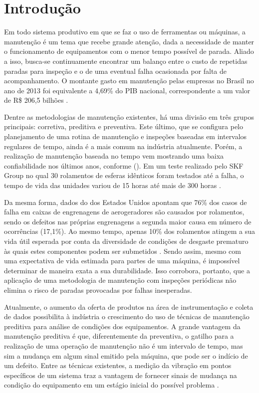 \documentclass[12pt,openright,oneside,a4paper,
	chapter=TITLE,section=TITLE,
	english,brazil]{abntex2}
\begin{document}
	
	\textual %
	
	\chapter{Introdução}
	Em todo sistema produtivo em que se faz o uso de ferramentas ou máquinas, a manutenção é um tema que recebe grande atenção, dada a necessidade de manter o funcionamento de equipamentos com o menor tempo possível de parada. Aliado a isso, busca-se continuamente encontrar um balanço entre o custo de repetidas paradas para inspeção e o de uma eventual falha ocasionada por falta de acompanhamento. O montante gasto em manutenção pelas empresas no Brasil no ano de 2013 foi equivalente a 4,69\% do PIB nacional, correspondente a um valor de R\$ 206,5 bilhões \cite{seleme:2015}.
	
	Dentre as metodologias de manutenção existentes, há uma divisão em três grupos principais: corretiva, preditiva e preventiva. Este último, que se configura pelo planejamento de uma rotina de manutenção e inspeções baseadas em intervalos regulares de tempo, ainda é a mais comum na indústria atualmente. Porém, a realização de manutenção baseada no tempo vem mostrando uma baixa confiabilidade nos últimos anos, conforme  (\citeyear{hashemian:2011}). Em um teste realizado pelo SKF Group no qual 30 rolamentos de esferas idênticos foram testados até a falha, o tempo de vida das unidades variou de 15 horas até mais de 300 horas \cite{hashemian:2011}.  
	
	Da mesma forma, dados do  dos Estados Unidos apontam que 76\% dos casos de falha em caixas de engrenagens de aerogeradores são causados por rolamentos, sendo os defeitos nas próprias engrenagens a segunda maior causa em número de ocorrências (17,1\%). Ao mesmo tempo, apenas 10\% dos rolamentos atingem a sua vida útil esperada por conta da diversidade de condições de desgaste prematuro às quais estes componentes podem ser submetidos \cite{peeters:2017}. Sendo assim, mesmo com uma expectativa de vida estimada para partes de uma máquina, é impossível determinar de maneira exata a sua durabilidade. Isso corrobora, portanto, que a aplicação de uma metodologia de manutenção com inspeções periódicas não elimina o risco de paradas provocadas por falhas inesperadas.
	
	Atualmente, o aumento da oferta de produtos na área de instrumentação e coleta de dados possibilita à indústria o crescimento do uso de técnicas de manutenção preditiva para análise de condições dos equipamentos. A grande vantagem da manutenção preditiva é que, diferentemente da preventiva, o gatilho para a realização de uma operação de manutenção não é um intervalo de tempo, mas sim a mudança em algum sinal emitido pela máquina, que pode ser o indício de um defeito. Entre as técnicas existentes, a medição da vibração em pontos específicos de um sistema traz a vantagem de fornecer sinais de mudança na condição do equipamento em um estágio inicial do possível problema \cite{al-najjar:2003}.
	
\end{document}
